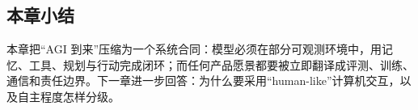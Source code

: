 \subsection{本章小结}

本章把“AGI 到来”压缩为一个系统合同：模型必须在部分可观测环境中，用记忆、工具、规划与行动完成闭环；而任何产品愿景都要被立即翻译成评测、训练、通信和责任边界。下一章进一步回答：为什么要采用“human-like”计算机交互，以及自主程度怎样分级。

